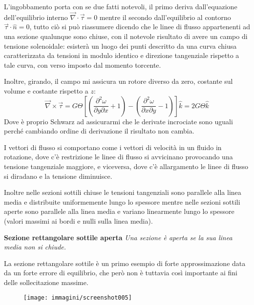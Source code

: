 \documentclass{article}
\begin{document}
\begin{adjustwidth}{2in}{}
			L'ingobbamento porta con se due fatti notevoli, il primo deriva dall'equazione dell'equilibrio interno $\vec{\nabla} \cdot \vec{\tau} = 0$ mentre il secondo dall'equilibrio al contorno $\vec{\tau} \cdot \hat{n}=0$, tutto ciò si può riassumere dicendo che le linee di flusso appartenenti ad una sezione qualunque sono chiuse, con il notevole risultato di avere un campo di tensione solenoidale: esisterà un luogo dei punti descritto da una curva chiusa caratterizzata da tensioni in modulo identico e direzione tangenziale rispetto a tale curva, con verso imposto dal momento torcente.\newline

			 Inoltre, girando, il campo mi assicura un rotore diverso da zero, costante sul volume e costante rispetto a $z$:
			 \[\vec{\nabla} \times \vec{\tau} = G\Theta \left[\left(\dfrac{\partial^2\omega}{\partial y \partial x} + 1\right) - \left(\dfrac{\partial^2\omega}{\partial x \partial y} - 1\right)\right]\hat{k} = 2G\Theta\hat{k}\]
			 Dove è proprio Schwarz ad assicurarmi che le derivate incrociate sono uguali perché cambiando ordine di derivazione il risultato non cambia. \newline 
			 
			 I vettori di flusso si comportano come i vettori di velocità in un fluido in rotazione, dove c'è restrizione le linee di flusso si avvicinano provocando una tensione tangenziale maggiore, e viceversa, dove c'è allargamento le linee di flusso si diradano e la tensione diminuisce. \newline 
			 
			 Inoltre nelle sezioni
			 sottili chiuse le tensioni tangenziali sono parallele alla linea media e distribuite
			 uniformemente lungo lo spessore mentre nelle sezioni sottili aperte sono parallele alla linea media e variano
			 linearmente lungo lo spessore (valori massimi ai bordi e nulli sulla linea media). \newline
			 
			 \textbf{{\Large Sezione rettangolare sottile aperta}}\newline
			 \textit{Una sezione è aperta se la sua linea media non si chiude. }\newline
			 
			 La sezione rettangolare sottile è un primo esempio di forte approssimazione data da un forte errore di equilibrio, che però non è tuttavia così importante ai fini delle sollecitazione massime.  
			 
\begin{figure}[H]
	\centering
	\label{fig:screenshot005}
	\texttt{[image: immagini/screenshot005]}
\end{figure}


\end{adjustwidth}
\end{document}
